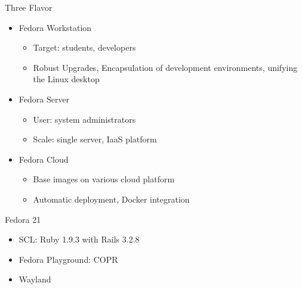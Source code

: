 \begin{frame}{Three Flavor}
  \begin{itemize}
    \item Fedora Workstation
      \begin{itemize}
        \item Target: students, developers
        \item Robust Upgrades, Encapsulation of development
          environments, unifying the Linux desktop
      \end{itemize}
    \item Fedora Server
      \begin{itemize}
        \item User: system administrators
        \item Scale: single server, IaaS platform
      \end{itemize}
    \item Fedora Cloud
      \begin{itemize}
        \item Base images on various cloud platform
        \item Automatic deployment, Docker integration
      \end{itemize}
  \end{itemize}
\end{frame}

\begin{frame}{Fedora 21}
  \begin{itemize}
    \item SCL: Ruby 1.9.3 with Rails 3.2.8
    \item Fedora Playground: COPR
    \item Wayland
  \end{itemize}
\end{frame}
